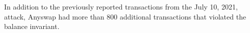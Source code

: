%
In addition to the previously reported transactions from the July 10, 2021,
attack, Anyswap had more than 800 additional transactions that violated the
balance invariant.





